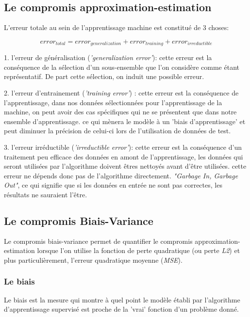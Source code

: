 \documentclass[a4paper]{article}
\begin{document}
\subsection{Le compromis approximation-estimation}
\label{A-E}
L'erreur totale au sein de l'apprentissage machine est constitué de 3 choses: \newline

\[ error_{total} = error_{generalization} + error_{training} + error_{irreductible} \]

1. l'erreur de généralisation (\textit{'generalization error'}): cette erreur est la conséquence de la sélection d'un sous-ensemble que l'on considère comme étant représentatif. De part cette sélection, on induit une possible erreur.\newline

2. l'erreur d'entrainement (\textit{'training error'}) : cette erreur est la conséquence de l'apprentissage, dans nos données sélectionnées pour l'apprentissage de la machine, on peut avoir des cas spécifiques qui ne se présentent que dans notre ensemble d'apprentissage. ce qui mènera le modèle à un 'biais d'apprentissage' et peut diminuer la précision de celui-ci lors de l'utilisation de données de test.\newline

3. l'erreur irréductible (\textit{'irreductible error'}): cette erreur est la conséquence d'un traitement peu efficace des données en amont de l'apprentissage, les données qui seront utilisées par l'algorithme doivent êtres nettoyés avant d'être utilisées. cette erreur ne dépends donc pas de l'algorithme directement.\newline
 \textit{"Garbage In, Garbage Out"}, ce qui signifie que si les données en entrée ne sont pas correctes, les résultats ne sauraient l'être. \newline

\newpage

\subsection{Le compromis Biais-Variance}

Le compromis biais-variance permet de quantifier le compromis approximation-estimation lorsque l'on utilise la fonction de perte quadratique (ou perte \textit{L2}) et plus particulièrement, l'erreur quadratique moyenne (\textit{MSE}).

\subsubsection{Le biais}
Le biais est la mesure qui montre à quel point le modèle établi par l'algorithme d'apprentissage supervisé est proche de la 'vrai' fonction d'un problème donné. \newline
\end{document}
